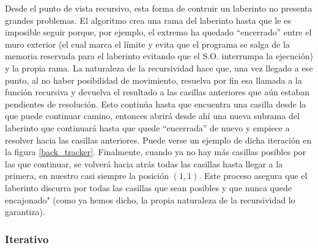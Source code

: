 \documentclass[12pt,a4paper]{article}
\begin{document}
Desde el punto de vista recursivo, esta forma de contruir un laberinto no presenta grandes problemas. El algoritmo crea una rama del laberinto hasta que le es imposible seguir porque, por ejemplo, el extremo ha quedado ``encerrado'' entre el muro exterior (el cual marca el límite y evita que el programa se salga de la memoria reservada para el laberinto evitando que el S.O. interrumpa la ejecución) y la propia rama. La naturaleza de la recursividad hace que, una vez llegado a ese punto, al no haber posibilidad de movimiento, resuelva por fin esa llamada a la función recursiva y devuelva el resultado a las casillas anteriores que aún estaban pendientes de resolución.  Esto continúa hasta que encuentra una casilla desde la que puede continuar camino, entonces abrirá desde ahí una nueva subrama del laberinto que continuará hasta que quede ``encerrada'' de nuevo y empiece a resolver hacia las casillas anteriores. Puede verse un ejemplo de dicha iteración en la figura \ref{back_tracker}. Finalmente, cuando ya no hay más casillas posibles por las que continuar, se volverá hacia atrás todas las casillas hasta llegar a la primera, en nuestro casi siempre la posición $(1,1)$. Este proceso asegura que el laberinto discurra por todas las casillas que sean posibles y que nunca quede encajonado" (como ya hemos dicho, la propia naturaleza de la recursividad lo garantiza).

\subsubsection{Iterativo}
\end{document}
